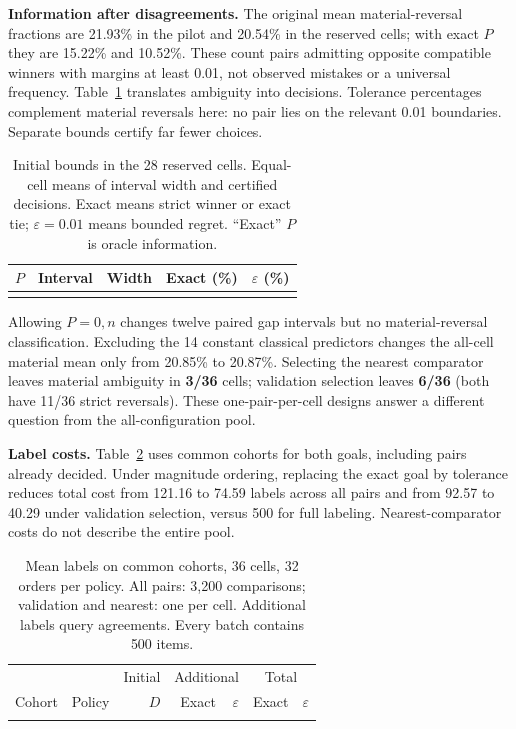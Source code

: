 \documentclass[a4paper]{esannV2}
\begin{document}
\textbf{Information after disagreements.} The original mean material-reversal
fractions are 21.93\% in the pilot and 20.54\% in the reserved cells; with
exact $P$ they are 15.22\% and 10.52\%. These count pairs admitting opposite
compatible winners with margins at least 0.01, not observed mistakes or a
universal frequency. Table~\ref{tab:intervals} translates ambiguity into decisions. Tolerance
percentages complement material reversals here: no pair lies on the relevant
0.01 boundaries. Separate bounds certify far fewer choices.

\begin{table}[!ht]
\centering
\begin{tabular}{llrrr}
\toprule
$P$ & Interval & Width & Exact (\%) & $\varepsilon$ (\%)\\
\midrule
\\
\bottomrule
\end{tabular}
\caption{Initial bounds in the 28 reserved cells. Equal-cell means of interval
width and certified decisions. Exact means strict winner or exact tie;
$\varepsilon=0.01$ means bounded regret. ``Exact'' $P$ is oracle information.}
\label{tab:intervals}
\end{table}

Allowing $P=0,n$ changes twelve paired gap intervals but no material-reversal
classification. Excluding the 14 constant classical predictors changes the
all-cell material mean only from 20.85\% to 20.87\%. Selecting the nearest
comparator leaves material ambiguity in \textbf{3/36} cells; validation selection leaves
\textbf{6/36} (both have 11/36 strict reversals). These one-pair-per-cell
designs answer a different question from the all-configuration pool.

\textbf{Label costs.} Table~\ref{tab:costs} uses common cohorts for both goals,
including pairs already decided. Under magnitude ordering, replacing the exact goal by tolerance reduces total
cost from 121.16 to 74.59 labels across all pairs and from 92.57 to 40.29
under validation selection, versus 500 for full labeling. Nearest-comparator
costs do not describe the entire pool.

\begin{table}[!ht]
\centering
\setlength{\tabcolsep}{3.5pt}
\begin{tabular}{llrrrrr}
\toprule
 & & Initial & \multicolumn{2}{c}{Additional} & \multicolumn{2}{c}{Total}\\
Cohort & Policy & $D$ & Exact & $\varepsilon$ & Exact & $\varepsilon$\\
\midrule
\\
\bottomrule
\end{tabular}
\caption{Mean labels on common cohorts, 36 cells, 32 orders per policy.
All pairs: 3,200 comparisons; validation and nearest: one per cell.
Additional labels query agreements. Every batch contains 500 items.}
\label{tab:costs}
\end{table}
\end{document}
